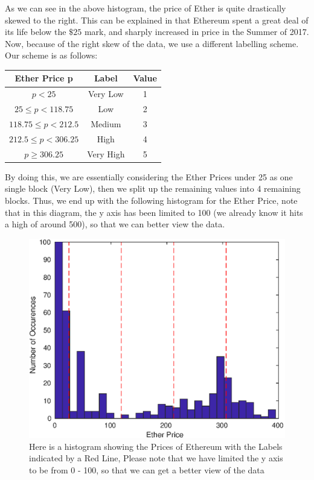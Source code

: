 \documentclass{article}
\begin{document}
As we can see in the above histogram, the price of Ether is quite drastically skewed to the right. This can be explained in that Ethereum spent a great deal of its life below the $\$25$ mark, and sharply increased in price in the Summer of 2017. Now, because of the right skew of the data, we use a different labelling scheme. Our scheme is as follows:

\begin{center}
\begin{tabular}{ |c|c|c| } 
\hline
Ether Price p & Label & Value\\
\hline
$p < 25$ & Very Low & 1\\ 
$25 \leq p < 118.75$ & Low & 2\\ 
$118.75 \leq p < 212.5$ & Medium & 3\\ 
$212.5 \leq p < 306.25$ & High & 4\\ 
$p \geq 306.25$ & Very High & 5\\ 
\hline
\end{tabular}
\end{center}

By doing this, we are essentially considering the Ether Prices under 25 as one single block (Very Low), then we split up the remaining values into 4 remaining blocks. Thus, we end up with the following histogram for the Ether Price, note that in this diagram, the y axis has been limited to 100 (we already know it hits a high of around 500), so that we can better view the data.

\begin{figure}[H]
\centering
\caption{Here is a histogram showing the Prices of Ethereum with the Labels indicated by a Red Line, Please note that we have limited the y axis to be from 0 - 100, so that we can get a better view of the data}
\includegraphics[scale=0.75]{main/eth_priceOnly.eps}
\end{figure}
\end{document}
